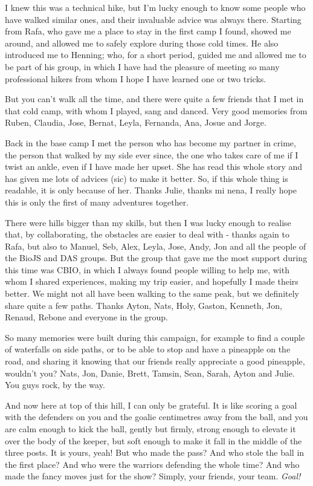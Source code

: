 \vspace{3mm}

I knew this was a technical hike, but I'm lucky enough to know some people who have walked similar ones, and their invaluable advice was always there. Starting from Rafa, who gave me a place to stay in the first camp I found, showed me around, and allowed me to safely explore during those cold times. He also introduced me to Henning; who, for a short period, guided me and allowed me to be part of his group, in which I have had the pleasure of meeting so many professional hikers from whom I hope I have learned one or two tricks.

But you can't walk all the time, and there were quite a few friends that I met in that cold camp, with whom I played, sang and danced. Very good memories from Ruben, Claudia, Jose, Bernat, Leyla, Fernanda, Ana, Josue and Jorge.

Back in the base camp I met the person who has become my partner in crime, the person that walked by my side ever since, the one who takes care of me if I twist an ankle, even if I have made her upset. She has read this whole story and has given me lots of advices (sic) to make it better. So, if this whole thing is readable, it is only because of her. Thanks Julie, thanks mi nena, I really hope this is only the first of many adventures together.

\vspace{3mm}

There were hills bigger than my skills, but then I was lucky enough to realise that, by collaborating, the obstacles are easier to deal with - thanks again to Rafa, but also to Manuel, Seb, Alex, Leyla, Jose, Andy, Jon and all the people of the BioJS and DAS groups. But the group that gave me the most support during this time was CBIO, in which I always found people willing to help me, with whom I shared experiences, making my trip easier, and hopefully I made theirs better. We might not all have been walking to the same peak, but we definitely share quite a few paths. Thanks Ayton, Nats, Holy, Gaston, Kenneth, Jon, Renaud, Rebone and everyone in the group.

So many memories were built during this campaign, for example to find a couple of waterfalls on side paths, or to be able to stop and have a pineapple on the road, and sharing it knowing that our friends really appreciate a good pineapple, wouldn't you? Nats, Jon, Danie, Brett, Tamsin, Sean, Sarah, Ayton and Julie. You guys rock, by the way.

\vspace{3mm}
And now here at top of this hill, I can only be grateful. It is like scoring a goal with the defenders on you and the goalie centimetres away from the ball, and you are calm enough to kick the ball, gently but firmly, strong enough to elevate it over the body of the keeper, but soft enough to make it fall in the middle of the three posts. It is yours, yeah! But who made the pass? And who stole the ball in the first place? And who were the warriors defending the whole time? And who made the fancy moves just for the show? Simply, your friends, your team. \emph{Goal!}
